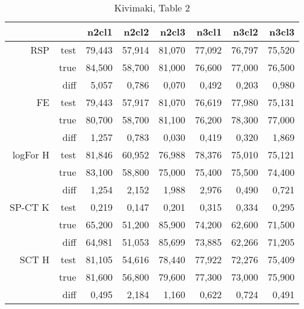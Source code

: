\documentclass{article}
\begin{document}
\begin{table}[H]
\centering
\caption{Kivimaki, Table 2}
\label{my-label}
\begin{tabular}{rr|rrrrrr}
         &      & n2cl1 & n2cl2 & n2cl3 & n3cl1 & n3cl2 & n3cl3 \\
         \hline
RSP      & test & 79,443       & 57,914       & 81,070       & 77,092       & 76,797       & 75,520       \\
         & true & 84,500       & 58,700       & 81,000       & 76,600       & 77,000       & 76,500       \\
         & diff & 5,057        & 0,786        & 0,070        & 0,492        & 0,203        & 0,980        \\
         \cline{2-8}
FE       & test & 79,443       & 57,917       & 81,070       & 76,619       & 77,980       & 75,131       \\
         & true & 80,700       & 58,700       & 81,100       & 76,200       & 78,300       & 77,000       \\
         & diff & 1,257        & 0,783        & 0,030        & 0,419        & 0,320        & 1,869        \\
         \cline{2-8}
logFor H & test & 81,846       & 60,952       & 76,988       & 78,376       & 75,010       & 75,121       \\
         & true & 83,100       & 58,800       & 75,000       & 75,400       & 75,500       & 74,400       \\
         & diff & 1,254        & 2,152        & 1,988        & 2,976        & 0,490        & 0,721        \\
         \cline{2-8}
SP-CT K  & test & 0,219        & 0,147        & 0,201        & 0,315        & 0,334        & 0,295        \\
         & true & 65,200       & 51,200       & 85,900       & 74,200       & 62,600       & 71,500       \\
         & diff & \cellcolor{red!25} 64,981 & \cellcolor{red!25} 51,053 & \cellcolor{red!25} 85,699 &
                      \cellcolor{red!25} 73,885 & \cellcolor{red!25} 62,266 & \cellcolor{red!25} 71,205 \\
         \cline{2-8}
SCT H    & test & 81,105       & 54,616       & 78,440       & 77,922       & 72,276       & 75,409       \\
         & true & 81,600       & 56,800       & 79,600       & 77,300       & 73,000       & 75,900       \\
         & diff & 0,495        & 2,184        & 1,160        & 0,622        & 0,724        & 0,491       
\end{tabular}
\end{table}
\end{document}
